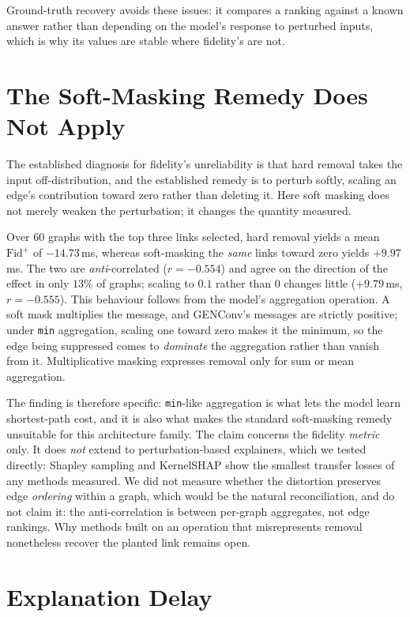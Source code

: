 \documentclass[conference]{IEEEtran}
\begin{document}
Ground-truth recovery avoids these issues: it compares a ranking against a
known answer rather than depending on the model's response to perturbed
inputs, which is why its values are stable where fidelity's are not.

\section{The Soft-Masking Remedy Does Not Apply}
\label{sec:soft}
The established diagnosis for fidelity's unreliability is that hard removal
takes the input off-distribution, and the established remedy is to perturb
softly, scaling an edge's contribution toward zero rather than deleting it.
Here soft masking does not merely weaken the perturbation; it changes the
quantity measured.

Over 60 graphs with the top three links selected, hard removal yields a mean
$\mathrm{Fid}^{+}$ of $-14.73$\,ms, whereas soft-masking the \emph{same} links
toward zero yields $+9.97$\,ms. The two are \emph{anti}-correlated
($r=-0.554$) and agree on the direction of the effect in only $13\%$ of
graphs; scaling to $0.1$ rather than $0$ changes little ($+9.79$\,ms,
$r=-0.555$). This behaviour follows from the model's aggregation operation. A soft mask multiplies the
message, and GENConv's messages are strictly positive; under \texttt{min}
aggregation, scaling one toward zero makes it the minimum, so the edge being
suppressed comes to \emph{dominate} the aggregation rather than vanish from it.
Multiplicative masking expresses removal only for sum or mean aggregation.

The finding is therefore specific: \texttt{min}-like aggregation is what lets
the model learn shortest-path cost, and it is also what makes the standard
soft-masking remedy unsuitable for this architecture family. The claim concerns the fidelity
\emph{metric} only. It does \emph{not} extend to perturbation-based explainers,
which we tested directly: Shapley sampling and KernelSHAP show the smallest
transfer losses of any methods measured. We did not measure whether the distortion preserves edge \emph{ordering}
within a graph, which would be the natural reconciliation, and do not claim
it: the anti-correlation is between per-graph aggregates, not edge rankings. Why methods built on an operation that misrepresents removal
nonetheless recover the planted link remains open.

\section{Explanation Delay}
\label{sec:delay}

\end{document}
